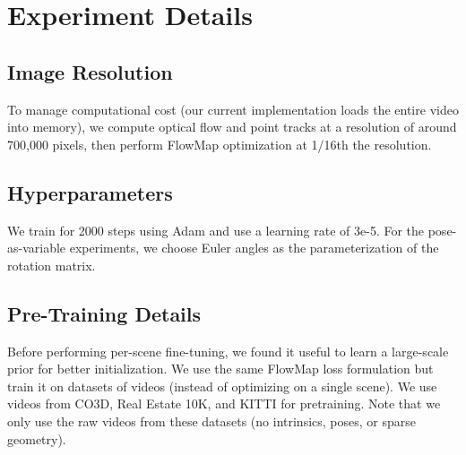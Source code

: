 
\section{Experiment Details}

\subsection{Image Resolution}

To manage computational cost (our current implementation loads the entire video into memory), we compute optical flow and point tracks at a resolution of around 700,000 pixels, then perform FlowMap optimization at 1/16th the resolution.

\subsection{Hyperparameters}

We train for 2000 steps using Adam and use a learning rate of 3e-5.
For the pose-as-variable experiments, we choose Euler angles as the parameterization of the rotation matrix.

\subsection{Pre-Training Details}

Before performing per-scene fine-tuning, we found it useful to learn a large-scale prior for better initialization.
We use the same FlowMap loss formulation but train it on datasets of videos (instead of optimizing on a single scene).
We use videos from CO3D, Real Estate 10K, and KITTI for pretraining.
Note that we only use the raw videos from these datasets (no intrinsics, poses, or sparse geometry).
